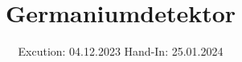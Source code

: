 

\subject{V18}
\title{Germaniumdetektor}
\date{%
  Excution: 04.12.2023
  \hspace{3em}
  Hand-In: 25.01.2024
}



\maketitle
\setcounter{page}{1}



\newpage




\printbibliography{}


